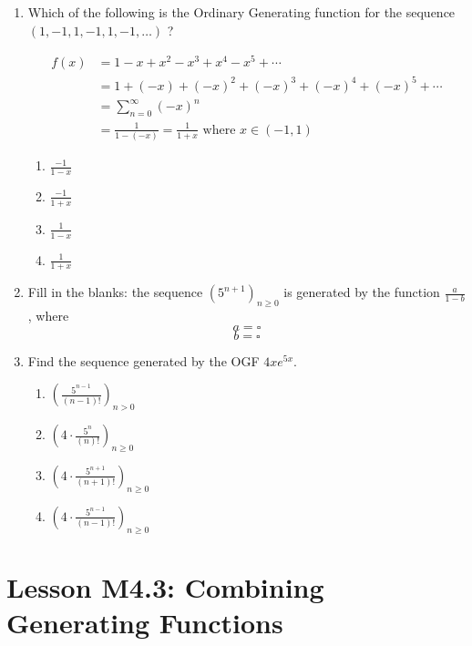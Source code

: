\documentclass{article}
\theoremstyle{definition}
\begin{document}
\begin{enumerate}
  \item Which of the following is the Ordinary 
  Generating function for the sequence $(1,-1,1,-1,1,-1, \ldots)$ ?

  \begin{align*}
  f(x) &= 1 - x + x^2 - x^3 + x^4 - x^5 + \cdots \\
  &= 1 + (- x) + (- x)^2 + (- x)^3 + (-x)^4 + (- x)^5 + \cdots \\
  &= \sum_{n=0}^{\infty} (-x)^n \\
  &= \frac{1}{1 - (-x)} = \frac{1}{1 + x} \text{ where $x \in (-1,1)$}
  \end{align*}
  \begin{enumerate}
    \item $\frac{-1}{1-x}$
    \item $\frac{-1}{1+x}$
    \item $\frac{1}{1-x}$
    \item $\frac{1}{1+x}$
  \end{enumerate}

  \item Fill in the blanks: the sequence $\left(5^{n+1}\right)_{n \geq 0}$ is generated by the function $\frac{a}{1-b}$, where
  $$
  a=\square
  $$
  $$
  b=\square
  $$


  \item Find the sequence generated by the OGF $4 x e^{5 x}$.
  \begin{enumerate}
    \item $\left(\frac{5^{n-1}}{(n-1)!}\right)_{n>0}$
    \item $\left(4 \cdot \frac{5^n}{(n)!}\right)_{n \geq 0}$
    \item $\left(4 \cdot \frac{5^{n+1}}{(n+1)!}\right)_{n \geq 0}$
    \item $\left(4 \cdot \frac{5^{n-1}}{(n-1)!}\right)_{n \geq 0}$
  \end{enumerate}



\end{enumerate}











\newpage



\section*{Lesson M4.3: Combining Generating Functions}
\end{document}
